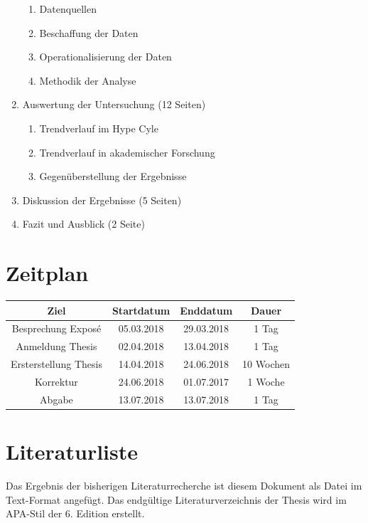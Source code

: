 \begin{enumerate}
	\begin{enumerate}
		\item Datenquellen
		\item Beschaffung der Daten
		\item Operationalisierung der Daten
		\item Methodik der Analyse
	\end{enumerate}
	\item Auswertung der Untersuchung (12 Seiten)
	\begin{enumerate}
		\item Trendverlauf im Hype Cyle
		\item Trendverlauf in akademischer Forschung
		\item Gegenüberstellung der Ergebnisse
	\end{enumerate}
	\item Diskussion der Ergebnisse (5 Seiten)
	\item Fazit und Ausblick (2 Seite)
\end{enumerate}

\section{Zeitplan}
\begin{tabular}{|c|c|c|c|}
	\hline 
	Ziel & Startdatum & Enddatum & Dauer \\ 
	\hline 
	Besprechung Exposé & 05.03.2018 & 29.03.2018 & 1 Tag \\ 
	\hline 
	Anmeldung Thesis & 02.04.2018 & 13.04.2018 & 1 Tag \\ 
	\hline 
	Ersterstellung Thesis & 14.04.2018 & 24.06.2018 & 10 Wochen \\ 
	\hline 
	Korrektur & 24.06.2018 & 01.07.2017 & 1 Woche \\ 
	\hline 
	Abgabe & 13.07.2018 & 13.07.2018 & 1 Tag \\ 
	\hline 
\end{tabular} 

\section{Literaturliste}
Das Ergebnis der bisherigen Literaturrecherche ist diesem Dokument als Datei im Text-Format angefügt.
Das endgültige Literaturverzeichnis der Thesis wird im APA-Stil der 6. Edition erstellt.
